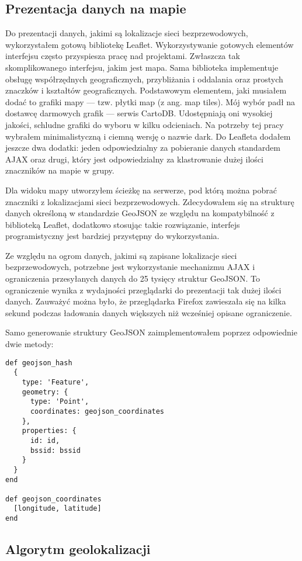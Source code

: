\subsection{Prezentacja danych na mapie}
Do prezentacji danych, jakimi są lokalizacje sieci bezprzewodowych, wykorzystałem gotową bibliotekę Leaflet. Wykorzystywanie gotowych elementów interfejsu często przyspiesza pracę nad projektami. Zwłaszcza tak skomplikowanego interfejsu, jakim jest mapa. Sama biblioteka implementuje obsługę współrzędnych geograficznych, przybliżania i oddalania oraz prostych znaczków i kształtów geograficznych. Podstawowym elementem, jaki musiałem dodać to grafiki mapy — tzw. płytki map (z ang. map tiles). Mój wybór padł na dostawcę darmowych grafik — serwis CartoDB. Udostępniają oni wysokiej jakości, schludne grafiki do wyboru w kilku odcieniach. Na potrzeby tej pracy wybrałem minimalistyczną i ciemną wersję o nazwie dark. Do Leafleta dodałem jeszcze dwa dodatki: jeden odpowiedzialny za pobieranie danych standardem AJAX oraz drugi, który jest odpowiedzialny za klastrowanie dużej ilości znaczników na mapie w grupy.

Dla widoku mapy utworzyłem ścieżkę na serwerze, pod którą można pobrać znaczniki z lokalizacjami sieci bezprzewodowych. Zdecydowałem się na strukturę danych określoną w standardzie GeoJSON ze względu na kompatybilność z biblioteką Leaflet, dodatkowo stosując takie rozwiązanie, interfejs programistyczny jest bardziej przystępny do wykorzystania.

Ze względu na ogrom danych, jakimi są zapisane lokalizacje sieci bezprzewodowych, potrzebne jest wykorzystanie mechanizmu AJAX i ograniczenia przesyłanych danych do 25 tysięcy struktur GeoJSON. To ograniczenie wynika z wydajności przeglądarki do prezentacji tak dużej ilości danych. Zauważyć można było, że przeglądarka Firefox zawieszała się na kilka sekund podczas ładowania danych większych niż wcześniej opisane ograniczenie.

Samo generowanie struktury GeoJSON zaimplementowałem poprzez odpowiednie dwie metody:

\begin{verbatim}
def geojson_hash
  {
    type: 'Feature',
    geometry: {
      type: 'Point',
      coordinates: geojson_coordinates
    },
    properties: {
      id: id,
      bssid: bssid
    }
  }
end

def geojson_coordinates
  [longitude, latitude]
end
\end{verbatim}

\subsection{Algorytm geolokalizacji}

